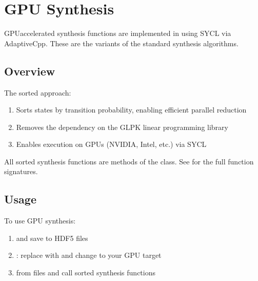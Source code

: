 \documentclass[a4paper,10pt,english]{sphinxmanual}
\begin{document}
\sphinxstepscope


\section{GPU Synthesis}
\label{\detokenize{api/gpu-synthesis:gpu-synthesis}}\label{\detokenize{api/gpu-synthesis::doc}}
\sphinxAtStartPar
GPU\sphinxhyphen{}accelerated synthesis functions are implemented in 
using SYCL via AdaptiveCpp. These are the  variants of the standard
synthesis algorithms.


\subsection{Overview}
\label{\detokenize{api/gpu-synthesis:overview}}
\sphinxAtStartPar
The sorted approach:
\begin{enumerate}
%
\item {} 
\sphinxAtStartPar
Sorts states by transition probability, enabling efficient parallel reduction

\item {} 
\sphinxAtStartPar
Removes the dependency on the GLPK linear programming library

\item {} 
\sphinxAtStartPar
Enables execution on GPUs (NVIDIA, Intel, etc.) via SYCL

\end{enumerate}

\sphinxAtStartPar
All sorted synthesis functions are methods of the {\hyperref[\detokenize{api/imdp:_CPPv44IMDP}]{}} class.
See {\hyperref[\detokenize{api/imdp::doc}]{}} for the full function signatures.


\subsection{Usage}
\label{\detokenize{api/gpu-synthesis:usage}}
\sphinxAtStartPar
To use GPU synthesis:
\begin{enumerate}
%
\item {} 
\sphinxAtStartPar
{} and save to HDF5 files

\item {} 
\sphinxAtStartPar
{}: replace  with 
and change  to your GPU target

\item {} 
\sphinxAtStartPar
{} from files and call sorted synthesis functions

\end{enumerate}
\end{document}
